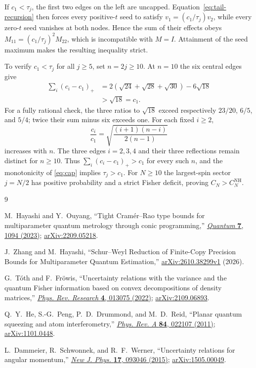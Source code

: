 \documentclass[aps,pra,reprint,superscriptaddress]{revtex4-2}
\theoremstyle{remark}
\newcommand{\nh}{\mathrm{NH}}
\begin{document}
If $c_1<\tau_j$, the first two edges on the left are uncapped.
Equation~\eqref{eq:tail-recursion} then forces every positive-$t$
seed to satisfy $v_1=(c_1/\tau_j)v_2$, while every zero-$t$ seed
vanishes at both nodes. Hence the sum of their effects obeys
$M_{11}=(c_1/\tau_j)^2M_{22}$, which is incompatible with
$M=I$. Attainment of the seed maximum makes the resulting
inequality strict.

To verify $c_1<\tau_j$ for all $j\geq5$, set $n=2j\geq10$.
At $n=10$ the six central edges give
\begin{align*}
 \sum_i(c_i-c_1)_+
 &=2(\sqrt{24}+\sqrt{28}+\sqrt{30})-6\sqrt{18}\\
 &>\sqrt{18}=c_1.
\end{align*}
For a fully rational check, the three ratios to $\sqrt{18}$
exceed respectively $23/20$, $6/5$, and $5/4$; twice their
sum minus six exceeds one. For each fixed $i\geq2$,
\[
 \frac{c_i}{c_1}=
 \sqrt{\frac{(i+1)(n-i)}{2(n-1)}}
\]
increases with $n$. The three edges $i=2,3,4$ and their three
reflections remain distinct for $n\geq10$. Thus
$\sum_i(c_i-c_1)_+>c_1$ for every such $n$, and the monotonicity
of \eqref{eq:cap} implies $\tau_j>c_1$.
For $N\geq10$ the largest-spin sector $j=N/2$ has positive
probability and a strict Fisher deficit, proving
$C_N>C_N^{\nh}$.

\begin{thebibliography}{9}
\raggedright

M.~Hayashi and Y.~Ouyang,
``Tight Cram\'er--Rao type bounds for multiparameter quantum metrology
through conic programming,''
\href{https://doi.org/10.22331/q-2023-08-29-1094}{\emph{Quantum} \textbf{7}, 1094 (2023)};
\href{https://arxiv.org/abs/2209.05218}{arXiv:2209.05218}.

J.~Zhang and M.~Hayashi,
``Schur--Weyl Reduction of Finite-Copy Precision Bounds for
Multiparameter Quantum Estimation,''
\href{https://arxiv.org/abs/2610.38299v1}{arXiv:2610.38299v1} (2026).

G.~T\'oth and F.~Fr\"owis,
``Uncertainty relations with the variance and the quantum Fisher
information based on convex decompositions of density matrices,''
\href{https://doi.org/10.1103/PhysRevResearch.4.013075}{\emph{Phys. Rev. Research} \textbf{4}, 013075 (2022)};
\href{https://arxiv.org/abs/2109.06893}{arXiv:2109.06893}.

Q.~Y.~He, S.-G.~Peng, P.~D.~Drummond, and M.~D.~Reid,
``Planar quantum squeezing and atom interferometry,''
\href{https://doi.org/10.1103/PhysRevA.84.022107}{\emph{Phys. Rev. A} \textbf{84}, 022107 (2011)};
\href{https://arxiv.org/abs/1101.0448}{arXiv:1101.0448}.

L.~Dammeier, R.~Schwonnek, and R.~F.~Werner,
``Uncertainty relations for angular momentum,''
\href{https://doi.org/10.1088/1367-2630/17/9/093046}{\emph{New J. Phys.} \textbf{17}, 093046 (2015)};
\href{https://arxiv.org/abs/1505.00049}{arXiv:1505.00049}.

\end{thebibliography}
\end{document}
